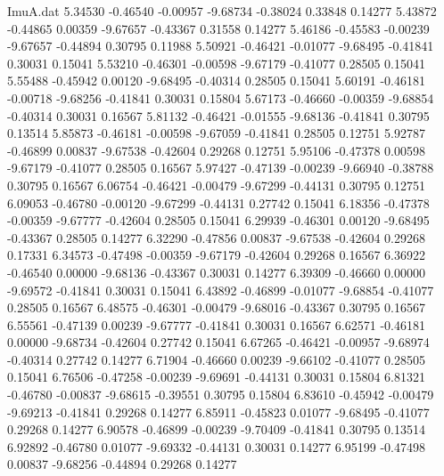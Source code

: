 \begin{filecontents}{ImuA.dat}
   5.34530   -0.46540   -0.00957   -9.68734   -0.38024    0.33848    0.14277
   5.43872   -0.44865    0.00359   -9.67657   -0.43367    0.31558    0.14277
   5.46186   -0.45583   -0.00239   -9.67657   -0.44894    0.30795    0.11988
   5.50921   -0.46421   -0.01077   -9.68495   -0.41841    0.30031    0.15041
   5.53210   -0.46301   -0.00598   -9.67179   -0.41077    0.28505    0.15041
   5.55488   -0.45942    0.00120   -9.68495   -0.40314    0.28505    0.15041
   5.60191   -0.46181   -0.00718   -9.68256   -0.41841    0.30031    0.15804
   5.67173   -0.46660   -0.00359   -9.68854   -0.40314    0.30031    0.16567
   5.81132   -0.46421   -0.01555   -9.68136   -0.41841    0.30795    0.13514
   5.85873   -0.46181   -0.00598   -9.67059   -0.41841    0.28505    0.12751
   5.92787   -0.46899    0.00837   -9.67538   -0.42604    0.29268    0.12751
   5.95106   -0.47378    0.00598   -9.67179   -0.41077    0.28505    0.16567
   5.97427   -0.47139   -0.00239   -9.66940   -0.38788    0.30795    0.16567
   6.06754   -0.46421   -0.00479   -9.67299   -0.44131    0.30795    0.12751
   6.09053   -0.46780   -0.00120   -9.67299   -0.44131    0.27742    0.15041
   6.18356   -0.47378   -0.00359   -9.67777   -0.42604    0.28505    0.15041
   6.29939   -0.46301    0.00120   -9.68495   -0.43367    0.28505    0.14277
   6.32290   -0.47856    0.00837   -9.67538   -0.42604    0.29268    0.17331
   6.34573   -0.47498   -0.00359   -9.67179   -0.42604    0.29268    0.16567
   6.36922   -0.46540    0.00000   -9.68136   -0.43367    0.30031    0.14277
   6.39309   -0.46660    0.00000   -9.69572   -0.41841    0.30031    0.15041
   6.43892   -0.46899   -0.01077   -9.68854   -0.41077    0.28505    0.16567
   6.48575   -0.46301   -0.00479   -9.68016   -0.43367    0.30795    0.16567
   6.55561   -0.47139    0.00239   -9.67777   -0.41841    0.30031    0.16567
   6.62571   -0.46181    0.00000   -9.68734   -0.42604    0.27742    0.15041
   6.67265   -0.46421   -0.00957   -9.68974   -0.40314    0.27742    0.14277
   6.71904   -0.46660    0.00239   -9.66102   -0.41077    0.28505    0.15041
   6.76506   -0.47258   -0.00239   -9.69691   -0.44131    0.30031    0.15804
   6.81321   -0.46780   -0.00837   -9.68615   -0.39551    0.30795    0.15804
   6.83610   -0.45942   -0.00479   -9.69213   -0.41841    0.29268    0.14277
   6.85911   -0.45823    0.01077   -9.68495   -0.41077    0.29268    0.14277
   6.90578   -0.46899   -0.00239   -9.70409   -0.41841    0.30795    0.13514
   6.92892   -0.46780    0.01077   -9.69332   -0.44131    0.30031    0.14277
   6.95199   -0.47498    0.00837   -9.68256   -0.44894    0.29268    0.14277

\end{filecontents}
